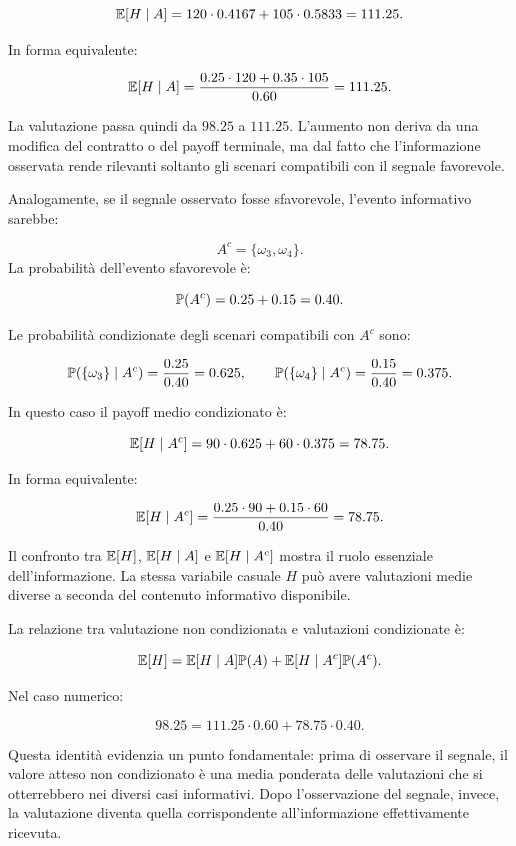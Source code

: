\[
\mathbb{E}[H\mid A]
=
120\cdot 0.4167
+
105\cdot 0.5833
=
111.25.
\]

In forma equivalente:

\[
\mathbb{E}[H\mid A]
=
\frac{0.25\cdot 120+0.35\cdot 105}{0.60}
=
111.25.
\]

La valutazione passa quindi da $98.25$ a $111.25$. L'aumento non deriva da una modifica del contratto o del payoff terminale, ma dal fatto che l'informazione osservata rende rilevanti soltanto gli scenari compatibili con il segnale favorevole.

Analogamente, se il segnale osservato fosse sfavorevole, l'evento informativo sarebbe:

\[
A^c=\{\omega_3,\omega_4\}.
\]
La probabilit\`{a} dell'evento sfavorevole \`{e}:

\[
\mathbb{P}(A^c)=0.25+0.15=0.40.
\]

Le probabilit\`{a} condizionate degli scenari compatibili con $A^c$ sono:

\[
\mathbb{P}(\{\omega_3\}\mid A^c)
=
\frac{0.25}{0.40}
=
0.625,
\qquad
\mathbb{P}(\{\omega_4\}\mid A^c)
=
\frac{0.15}{0.40}
=
0.375.
\]

In questo caso il payoff medio condizionato \`{e}:

\[
\mathbb{E}[H\mid A^c]
=
90\cdot 0.625
+
60\cdot 0.375
=
78.75.
\]

In forma equivalente:

\[
\mathbb{E}[H\mid A^c]
=
\frac{0.25\cdot 90+0.15\cdot 60}{0.40}
=
78.75.
\]

Il confronto tra $ \mathbb{E}[H] $, $ \mathbb{E}[H\mid A] $ e $ \mathbb{E}[H\mid A^c] $ mostra il ruolo essenziale dell'informazione. La stessa variabile casuale $H$ pu\`{o} avere valutazioni medie diverse a seconda del contenuto informativo disponibile.

\medskip

La relazione tra valutazione non condizionata e valutazioni condizionate \`{e}:

\[
\mathbb{E}[H]
=
\mathbb{E}[H\mid A]\mathbb{P}(A)
+
\mathbb{E}[H\mid A^c]\mathbb{P}(A^c).
\]

Nel caso numerico:

\[
98.25
=
111.25\cdot 0.60
+
78.75\cdot 0.40.
\]

Questa identit\`{a} evidenzia un punto fondamentale: prima di osservare il segnale, il valore atteso non condizionato \`{e} una media ponderata delle valutazioni che si otterrebbero nei diversi casi informativi. Dopo l'osservazione del segnale, invece, la valutazione diventa quella corrispondente all'informazione effettivamente ricevuta.

